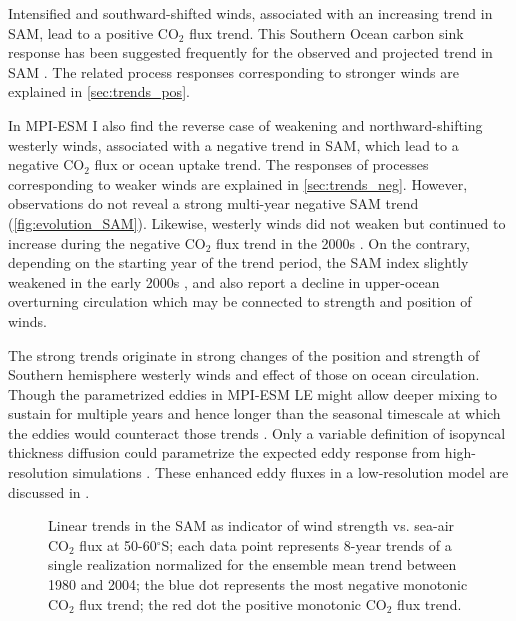 Intensified and southward-shifted winds, associated with an increasing trend in \acs{SAM}, lead to a positive CO$_2$ flux trend. This Southern Ocean carbon sink response has been suggested frequently for the observed and projected trend in \acs{SAM} \citep{LeQuere2007,Lovenduski2007,Lovenduski2008,Hauck2013,landschuetzer2015}. The related process responses corresponding to stronger winds are explained in \autoref{sec:trends_pos}.

In \acs{MPI-ESM} I also find the reverse case of weakening and northward-shifting westerly winds, associated with a negative trend in \acs{SAM}, which lead to a negative CO$_2$ flux or ocean uptake trend. The responses of processes corresponding to weaker winds are explained in \autoref{sec:trends_neg}. However, observations do not reveal a strong multi-year negative \acs{SAM} trend (\autoref{fig:evolution_SAM}). Likewise, westerly winds did not weaken but continued to increase during the negative CO$_2$ flux trend in the 2000s \citep{landschuetzer2015}. On the contrary, depending on the starting year of the trend period, the \acs{SAM} index slightly weakened in the early 2000s \citep{Marshall2003,Lovenduski2015}, and also \cite{DeVries2017} report a decline in upper-ocean overturning circulation which may be connected to strength and position of winds. \newline

The strong trends originate in strong changes of the position and strength of Southern hemisphere westerly winds and effect of those on ocean circulation. Though the parametrized eddies in \acs{MPI-ESM LE} might allow deeper mixing to sustain for multiple years and hence longer than the seasonal timescale at which the eddies would counteract those trends \citep{Thompson2011}. Only a variable definition of isopyncal thickness diffusion could parametrize the expected eddy response from high-resolution simulations \citep{Gent2011}. These enhanced eddy fluxes in a low-resolution model are discussed in \cite{Lovenduski2013}.


\begin{figure}[h!]
\centering
		\captionsetup[subfigure]{labelformat=empty,justification=centering}
		\vspace{-2mm}
		\caption{Linear trends in the \ac{SAM} as indicator of wind strength vs. sea-air CO$_2$ flux at 50-60$^\circ$S; each data point represents 8-year trends of a single realization normalized for the ensemble mean trend  between 1980 and 2004; the blue dot represents the most negative monotonic CO$_2$ flux trend; the red dot the positive monotonic CO$_2$ flux trend.}
		\label{fig:scatter}
\end{figure}

